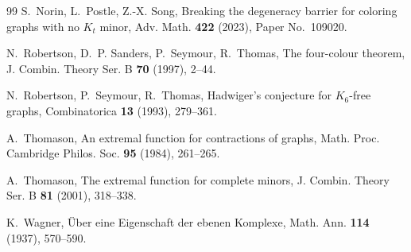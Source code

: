 \documentclass[11pt,a4paper]{article}
\theoremstyle{definition}
\theoremstyle{remark}
\begin{document}
{\begin{thebibliography}{99}
S.~Norin, L.~Postle, Z.-X. Song,
Breaking the degeneracy barrier for coloring graphs with no $K_t$ minor,
Adv. Math. \textbf{422} (2023), Paper No.~109020.


N.~Robertson, D.~P. Sanders, P.~Seymour, R.~Thomas,
The four-colour theorem,
J. Combin. Theory Ser. B \textbf{70} (1997), 2--44.


N.~Robertson, P.~Seymour, R.~Thomas,
Hadwiger's conjecture for $K_6$-free graphs,
Combinatorica \textbf{13} (1993), 279--361.



A.~Thomason,
An extremal function for contractions of graphs,
Math. Proc. Cambridge Philos. Soc. \textbf{95} (1984), 261--265.

A.~Thomason,
The extremal function for complete minors,
J. Combin. Theory Ser. B \textbf{81} (2001), 318--338.

K.~Wagner,
{\"U}ber eine Eigenschaft der ebenen Komplexe,
Math. Ann. \textbf{114} (1937), 570--590.

\end{thebibliography}
}
\end{document}
